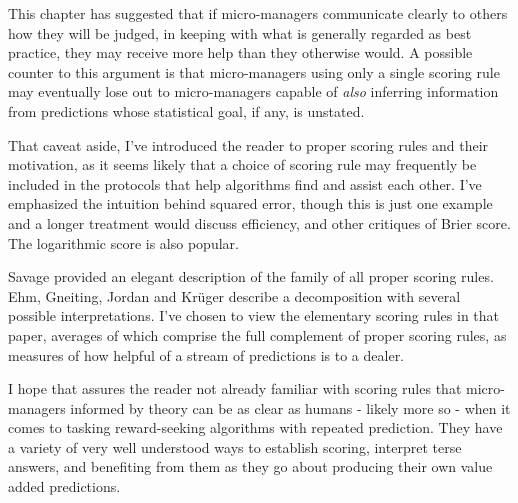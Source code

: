 This chapter has suggested that if micro-managers communicate clearly to others how they will be judged, in keeping with what is generally regarded as best practice, they may receive more help than they otherwise would. A possible counter to this argument is that micro-managers using only a single scoring rule may eventually lose out to micro-managers capable of {\em also} inferring information from predictions whose statistical goal, if any, is unstated.

That caveat aside, I've introduced the reader to proper scoring rules and their motivation, as it seems likely that a choice of scoring rule may frequently be included in the protocols that help algorithms find and assist each other. I've emphasized the intuition behind squared error, though this is just one example and a longer treatment would discuss efficiency, and other critiques of Brier score. The logarithmic score is also popular. 

Savage provided an elegant description of the family of all proper scoring rules. Ehm, Gneiting, Jordan and Kr\"uger describe a decomposition with several possible interpretations. I've chosen to view the elementary scoring rules in that paper, averages of which comprise the full complement of proper scoring rules, as measures of how helpful of a stream of predictions is to a dealer.  


I hope that assures the reader not already familiar with scoring rules that micro-managers informed by theory can be as clear as humans - likely more so - when it comes to tasking reward-seeking algorithms with repeated prediction. They have a variety of very well understood ways to establish scoring, interpret terse answers, and benefiting from them as they go about producing their own value added predictions.    




